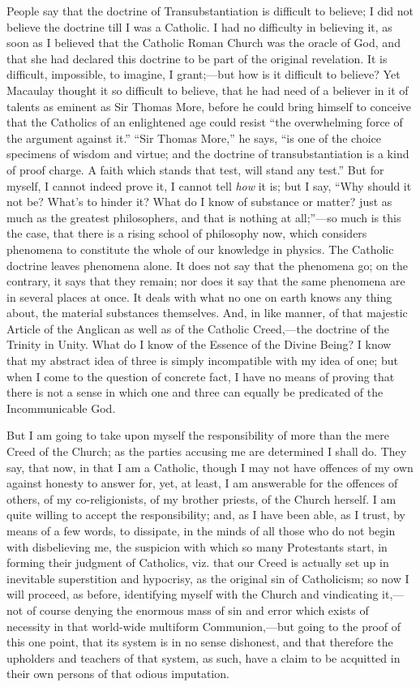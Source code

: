 People say that the doctrine of Transubstantiation is difficult to
believe; I did not believe the doctrine till I was a Catholic. I had no
difficulty in believing it, as soon as I believed that the
Catholic Roman Church was the oracle of God, and that she had declared
this doctrine to be part of the original revelation. It is difficult,
impossible, to imagine, I grant;—but how is it
difficult to believe? Yet Macaulay thought it so difficult to believe,
that he had need of a believer in it of talents as eminent as Sir Thomas
More, before he could bring himself to conceive that the Catholics of an
enlightened age could resist ``the overwhelming force of the
argument against it.'' ``Sir Thomas More,'' he says,
``is one of the choice specimens of wisdom and virtue; and the
doctrine of transubstantiation is a kind of proof charge. A faith which
stands that test, will stand any test.'' But for myself, I cannot
indeed prove it, I cannot tell \emph{how} it is; but I say, ``Why
should it not be? What's to hinder it? What do I know of
substance or matter? just as much as the greatest philosophers, and
that
is nothing at all;''—so much is this the case, that there is a
rising school of philosophy now, which considers phenomena to constitute
the whole of our knowledge in physics. The Catholic doctrine leaves
phenomena alone. It does not say that the phenomena go; on the
contrary, it says that they remain; nor does it say that the same
phenomena are in several places at once. It deals with what no one on
earth knows any thing about, the material substances themselves. And, in
like manner, of that majestic Article of the Anglican as well as of the
Catholic Creed,—the doctrine of the Trinity in Unity. What do I know
of the Essence of the Divine Being? I know that my abstract idea of
three is simply incompatible with my idea of one; but when I come to the
question of concrete fact, I have no means of proving that there is not
a sense in which one and three can equally be predicated of the
Incommunicable God.

But I am going to take upon myself the responsibility of more than
the mere Creed of the Church; as the parties accusing me are determined
I shall do. They say, that now, in that I am a Catholic, though I may
not have offences of my own against honesty to answer for, yet, at
least, I am answerable for the offences of others, of my
co-religionists, of my brother priests, of the Church herself. I am
quite willing to accept the responsibility; and, as I have been able, as
I trust, by means of a few words, to dissipate, in the minds of all
those who do not begin with disbelieving me, the suspicion with which so
many Protestants start, in forming their judgment of Catholics, viz.
that our Creed is actually set up in inevitable superstition and
hypocrisy, as the original sin of Catholicism; so now I will proceed, as before, identifying myself with the Church and vindicating it,—not
of course denying the enormous mass of sin and error which
exists of necessity in that world-wide multiform Communion,—but going
to the proof of this one point, that its system is in no sense
dishonest, and that therefore the upholders and teachers of that system,
as such, have a claim to be acquitted in their own persons of that
odious imputation.

